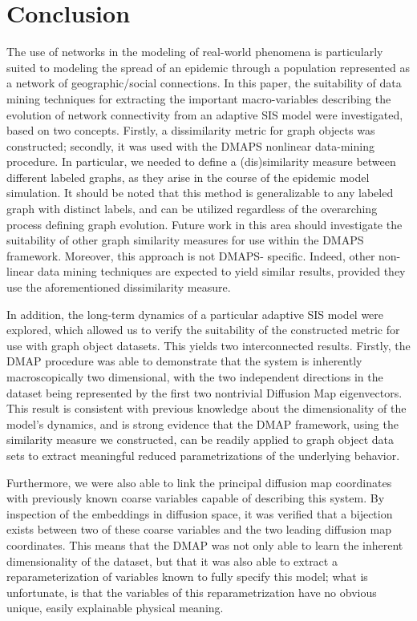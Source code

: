 \section{Conclusion}

The use of networks in the modeling of real-world phenomena is
particularly suited to modeling the spread of an epidemic through a
population represented as a network of geographic/social
connections. In this paper, the suitability of data mining techniques
for extracting the important macro-variables describing the evolution
of network connectivity from an adaptive SIS model were investigated,
based on two concepts. Firstly, a dissimilarity metric for graph
objects was constructed; secondly, it was used with the DMAPS
nonlinear data-mining procedure. In particular, we needed to define a
(dis)similarity measure between different labeled graphs, as they
arise in the course of the epidemic model simulation. It should be
noted that this method is generalizable to any labeled graph with
distinct labels, and can be utilized regardless of the overarching
process defining graph evolution. Future work in this area should
investigate the suitability of other graph similarity measures for use
within the DMAPS framework. Moreover, this approach is not DMAPS-
specific. Indeed, other non-linear data mining techniques are expected
to yield similar results, provided they use the aforementioned
dissimilarity measure.

In addition, the long-term dynamics of a particular adaptive SIS model
were explored, which allowed us to verify the suitability of the
constructed metric for use with graph object datasets. This yields two
interconnected results. Firstly, the DMAP procedure was able to
demonstrate that the system is inherently macroscopically two
dimensional, with the two independent directions in the dataset being
represented by the first two nontrivial Diffusion Map
eigenvectors. This result is consistent with previous knowledge about
the dimensionality of the model’s dynamics, and is strong evidence
that the DMAP framework, using the similarity measure we constructed,
can be readily applied to graph object data sets to extract meaningful
reduced parametrizations of the underlying behavior.

Furthermore, we were also able to link the principal diffusion map
coordinates with previously known coarse variables capable of
describing this system. By inspection of the embeddings in diffusion
space, it was verified that a bijection exists between two of these
coarse variables and the two leading diffusion map coordinates. This
means that the DMAP was not only able to learn the inherent
dimensionality of the dataset, but that it was also able to extract a
reparameterization of variables known to fully specify this model;
what is unfortunate, is that the variables of this reparametrization
have no obvious unique, easily explainable physical meaning.

